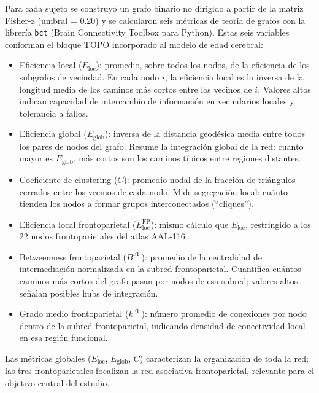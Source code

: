 \documentclass[12pt,a4paper]{article}
\begin{document}
Para cada sujeto se construyó un grafo binario no dirigido a partir de la matriz Fisher-z
(umbral = 0.20) y se calcularon seis métricas de teoría de grafos con la librería
\texttt{bct} (Brain Connectivity Toolbox para Python)\cite{rubinov2010}. Estas seis
variables conforman el bloque TOPO incorporado al modelo de edad cerebral:

\begin{itemize}
  \item Eficiencia local ($E_{\text{loc}}$): promedio, sobre todos los nodos, de la eficiencia
        de los subgrafos de vecindad. En cada nodo $i$, la eficiencia local es la inversa de la
        longitud media de los caminos más cortos entre los vecinos de $i$. Valores altos indican
        capacidad de intercambio de información en vecindarios locales y tolerancia a fallos.
  \item Eficiencia global ($E_{\text{glob}}$): inversa de la distancia geodésica media entre
        todos los pares de nodos del grafo. Resume la integración global de la red: cuanto mayor
        es $E_{\text{glob}}$, más cortos son los caminos típicos entre regiones distantes.
  \item Coeficiente de clustering ($C$): promedio nodal de la fracción de triángulos cerrados
        entre los vecinos de cada nodo. Mide segregación local: cuánto tienden los nodos a
        formar grupos interconectados (``cliques'').
  \item Eficiencia local frontoparietal ($E_{\text{loc}}^{\text{FP}}$): mismo cálculo que
        $E_{\text{loc}}$, restringido a los 22 nodos frontoparietales del atlas AAL-116.
  \item Betweenness frontoparietal ($B^{\text{FP}}$): promedio de la centralidad de
        intermediación normalizada en la subred frontoparietal. Cuantifica cuántos caminos
        más cortos del grafo pasan por nodos de esa subred; valores altos señalan posibles
        hubs de integración.
  \item Grado medio frontoparietal ($k^{\text{FP}}$): número promedio de conexiones por nodo
        dentro de la subred frontoparietal, indicando densidad de conectividad local en esa
        región funcional.
\end{itemize}

Las métricas globales ($E_{\text{loc}}$, $E_{\text{glob}}$, $C$) caracterizan la organización
de toda la red; las tres frontoparietales focalizan la red asociativa frontoparietal, relevante
para el objetivo central del estudio.
\end{document}
